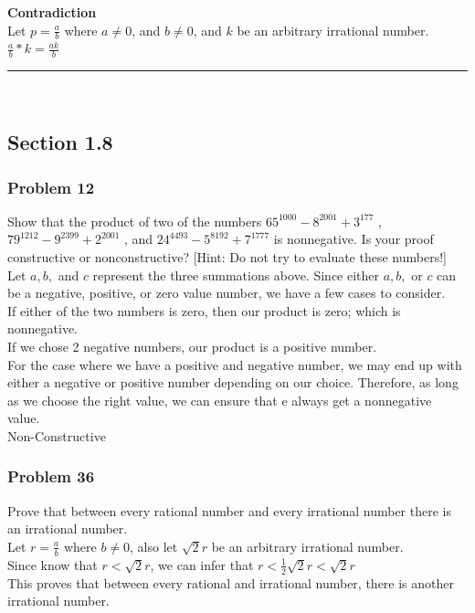 \documentclass[paper=a4, fontsize=11pt]{scrartcl} %
\newcommand{\horrule}[1]{\rule{\linewidth}{#1}} %
\begin{document}
\textbf{Contradiction}\\
Let $p = \frac{a}{b}$ where $a \not = 0$, and $b \not = 0$, and $k$ be an arbitrary irrational number.\\
$\frac{a}{b} * k = \frac{ak}{b}$\\


\horrule{0.5pt} \\ %
\subsection*{Section 1.8}
\subsubsection*{Problem 12}
Show that the product of two of the numbers $65^{1000} - 8^{2001} + 3^{177}$ , 
$79^{1212} - 9^{2399} + 2^{2001}$ , and $24^{4493} - 5^{8192} + 7^{1777}$ 
is nonnegative. Is your proof constructive or nonconstructive? 
[Hint: Do not try to evaluate these numbers!]\\

Let $a, b,$ and $c$ represent the three summations above.
Since either $a, b,$ or $c$ can be a negative, positive, or zero value number, we have
a few cases to consider.\\
If either of the two numbers is zero, then our product is zero; which is nonnegative.\\
If we chose 2 negative numbers, our product is a positive number.\\
For the case where we have a positive and negative number, we may end up with either a negative or
positive number depending on our choice. Therefore, as long as we choose the right value, we can
ensure that e always get a nonnegative value.\\

Non-Constructive\\
\subsubsection*{Problem 36}
Prove that between every rational number and every irrational number there is an irrational number.\\

Let $r = \frac{a}{b}$ where $b \not = 0$, also let $\sqrt{2}r$ be an arbitrary irrational number.\\
Since know that $r < \sqrt{2}r$, we can infer that $r < \frac{1}{2}\sqrt{2}r < \sqrt{2}r$\\
This proves that between every rational and irrational number, there is another irrational number.\\
\end{document}
